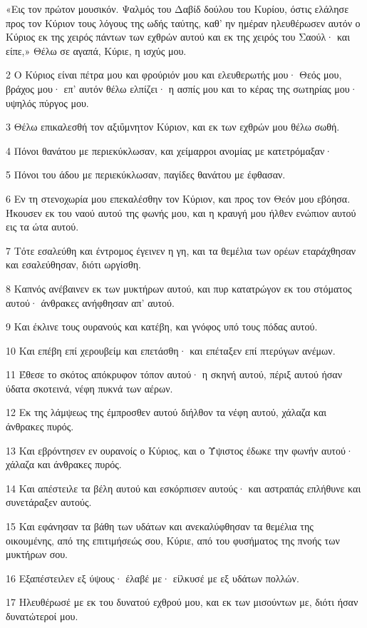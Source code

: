\par «Εις τον πρώτον μουσικόν. Ψαλμός του Δαβίδ δούλου του Κυρίου, όστις ελάλησε προς τον Κύριον τους λόγους της ωδής ταύτης, καθ' ην ημέραν ηλευθέρωσεν αυτόν ο Κύριος εκ της χειρός πάντων των εχθρών αυτού και εκ της χειρός του Σαούλ· και είπε,» Θέλω σε αγαπά, Κύριε, η ισχύς μου.
\par 2 Ο Κύριος είναι πέτρα μου και φρούριόν μου και ελευθερωτής μου· Θεός μου, βράχος μου· επ' αυτόν θέλω ελπίζει· η ασπίς μου και το κέρας της σωτηρίας μου· υψηλός πύργος μου.
\par 3 Θέλω επικαλεσθή τον αξιΰμνητον Κύριον, και εκ των εχθρών μου θέλω σωθή.
\par 4 Πόνοι θανάτου με περιεκύκλωσαν, και χείμαρροι ανομίας με κατετρόμαξαν·
\par 5 Πόνοι του άδου με περιεκύκλωσαν, παγίδες θανάτου με έφθασαν.
\par 6 Εν τη στενοχωρία μου επεκαλέσθην τον Κύριον, και προς τον Θεόν μου εβόησα. Ήκουσεν εκ του ναού αυτού της φωνής μου, και η κραυγή μου ήλθεν ενώπιον αυτού εις τα ώτα αυτού.
\par 7 Τότε εσαλεύθη και έντρομος έγεινεν η γη, και τα θεμέλια των ορέων εταράχθησαν και εσαλεύθησαν, διότι ωργίσθη.
\par 8 Καπνός ανέβαινεν εκ των μυκτήρων αυτού, και πυρ κατατρώγον εκ του στόματος αυτού· άνθρακες ανήφθησαν απ' αυτού.
\par 9 Και έκλινε τους ουρανούς και κατέβη, και γνόφος υπό τους πόδας αυτού.
\par 10 Και επέβη επί χερουβείμ και επετάσθη· και επέταξεν επί πτερύγων ανέμων.
\par 11 Έθεσε το σκότος απόκρυφον τόπον αυτού· η σκηνή αυτού, πέριξ αυτού ήσαν ύδατα σκοτεινά, νέφη πυκνά των αέρων.
\par 12 Εκ της λάμψεως της έμπροσθεν αυτού διήλθον τα νέφη αυτού, χάλαζα και άνθρακες πυρός.
\par 13 Και εβρόντησεν εν ουρανοίς ο Κύριος, και ο Ύψιστος έδωκε την φωνήν αυτού· χάλαζα και άνθρακες πυρός.
\par 14 Και απέστειλε τα βέλη αυτού και εσκόρπισεν αυτούς· και αστραπάς επλήθυνε και συνετάραξεν αυτούς.
\par 15 Και εφάνησαν τα βάθη των υδάτων και ανεκαλύφθησαν τα θεμέλια της οικουμένης, από της επιτιμήσεώς σου, Κύριε, από του φυσήματος της πνοής των μυκτήρων σου.
\par 16 Εξαπέστειλεν εξ ύψους· έλαβέ με· είλκυσέ με εξ υδάτων πολλών.
\par 17 Ηλευθέρωσέ με εκ του δυνατού εχθρού μου, και εκ των μισούντων με, διότι ήσαν δυνατώτεροί μου.
